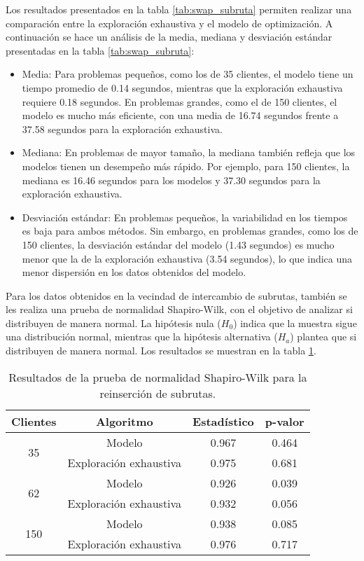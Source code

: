 \documentclass[12pt]{report}
\begin{document}
Los resultados presentados en la tabla \ref{tab:swap_subruta} permiten realizar una comparación entre la exploración exhaustiva y el modelo de optimización. A continuación se hace un análisis de la media, mediana y desviación estándar presentadas en la tabla
\ref{tab:swap_subruta}:
\begin{itemize}
	\item Media: Para problemas pequeños, como los de 35 clientes, el modelo tiene un tiempo promedio de 0.14 segundos, mientras que la exploración exhaustiva requiere 0.18 segundos. En problemas grandes, como el de 150 clientes, el modelo es mucho más eficiente, con una media de 16.74 segundos frente a 37.58 segundos para la exploración exhaustiva.
	\item Mediana: En problemas de mayor tamaño, la mediana también refleja que los modelos tienen un desempeño más rápido. Por ejemplo, para 150 clientes, la mediana es 16.46 segundos para los modelos y 37.30 segundos para la exploración exhaustiva.
	\item Desviación estándar: En problemas pequeños, la variabilidad en los tiempos es baja para ambos métodos. Sin embargo, en problemas grandes, como los de 150 clientes, la desviación estándar del modelo (1.43 segundos) es mucho menor que la de la exploración exhaustiva (3.54 segundos), lo que indica una menor dispersión en los datos obtenidos del modelo.
\end{itemize}

Para los datos obtenidos en la vecindad de intercambio de subrutas, también se les realiza una prueba de normalidad Shapiro-Wilk, con el objetivo de analizar si distribuyen de manera normal. La hipótesis nula ($H_0$) indica que la muestra sigue una distribución normal, mientras que la hipótesis alternativa ($H_a$) plantea que si distribuyen de manera normal. Los resultados se muestran en la tabla \ref{tab:Shapiro swap subrutas}.

\begin{table}[h]
	\centering
	\begin{tabular}{|c|c|c|c|}
		\hline
		\textbf{Clientes} & \textbf{Algoritmo} & \textbf{Estadístico} & \textbf{p-valor} \\
		\hline
		\multirow{2}{*}{35} & Modelo & 0.967 & 0.464 \\
		& Exploración exhaustiva & 0.975 & 0.681 \\
		\hline
		\multirow{2}{*}{62} & Modelo & 0.926 & 0.039 \\
		& Exploración exhaustiva & 0.932 & 0.056 \\
		\hline
		\multirow{2}{*}{150} & Modelo & 0.938 & 0.085 \\
		& Exploración exhaustiva & 0.976 & 0.717 \\
		\hline
	\end{tabular}
	\caption{Resultados de la prueba de normalidad Shapiro-Wilk para la reinserción de subrutas.}
	\label{tab:Shapiro swap subrutas}
\end{table}
\end{document}
